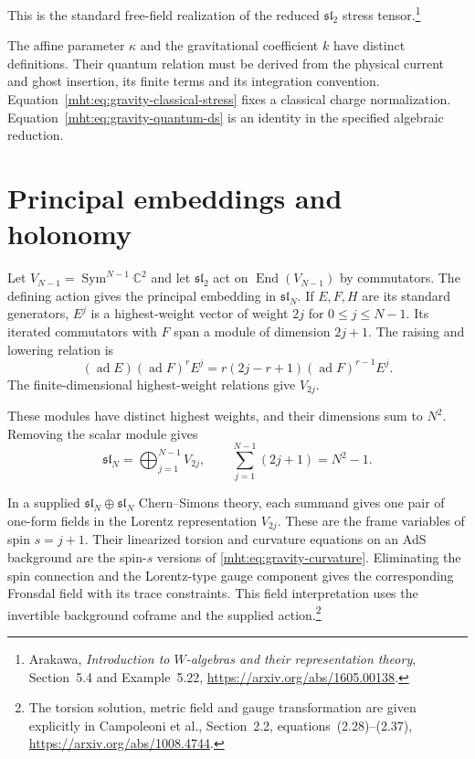 This is the standard free-field realization of the reduced
$\mathfrak{sl}_2$ stress tensor.\footnote{Arakawa,
\emph{Introduction to $W$-algebras and their representation theory},
Section~5.4 and Example~5.22,
\url{https://arxiv.org/abs/1605.00138}.}

The affine parameter $\kappa$ and the gravitational coefficient
$k$ have distinct definitions. Their quantum relation must be
derived from the physical current and ghost insertion, its finite
terms and its integration convention.
Equation~\eqref{mht:eq:gravity-classical-stress} fixes a classical
charge normalization. Equation~\eqref{mht:eq:gravity-quantum-ds}
is an identity in the specified algebraic reduction.

\section{Principal embeddings and holonomy}

Let $V_{N-1}=\operatorname{Sym}^{N-1}\mathbb C^2$ and let
$\mathfrak{sl}_2$ act on $\operatorname{End}(V_{N-1})$ by
commutators. The defining action gives the principal embedding
in $\mathfrak{sl}_N$.
If $E,F,H$ are its standard generators, $E^j$ is a highest-weight
vector of weight $2j$ for $0\le j\le N-1$.
Its iterated commutators with $F$ span a module of dimension $2j+1$.
The raising and lowering relation is
\[
 (\operatorname{ad}E)(\operatorname{ad}F)^rE^j
 =r(2j-r+1)(\operatorname{ad}F)^{r-1}E^j.
\]
The finite-dimensional highest-weight relations give $V_{2j}$.

These modules have distinct highest weights, and their dimensions
sum to $N^2$.
Removing the scalar module gives
\begin{equation}\label{mht:eq:gravity-principal-decomposition}
 \mathfrak{sl}_N=\bigoplus_{j=1}^{N-1}V_{2j},
 \qquad \sum_{j=1}^{N-1}(2j+1)=N^2-1.
\end{equation}

In a supplied $\mathfrak{sl}_N\oplus\mathfrak{sl}_N$
Chern--Simons theory, each summand gives one pair of one-form
fields in the Lorentz representation $V_{2j}$.
These are the frame variables of spin $s=j+1$.
Their linearized torsion and curvature equations on an AdS background
are the spin-$s$ versions of \eqref{mht:eq:gravity-curvature}.
Eliminating the spin connection and the Lorentz-type gauge component
gives the corresponding Fronsdal field with its trace constraints.
This field interpretation uses the invertible background coframe
and the supplied action.\footnote{The torsion solution, metric
field and gauge transformation are given explicitly in
Campoleoni et al., Section~2.2, equations~(2.28)--(2.37),
\url{https://arxiv.org/abs/1008.4744}.}

